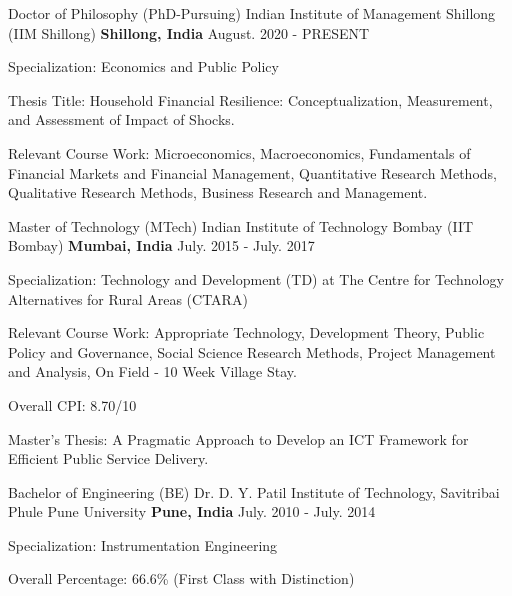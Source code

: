 
\begin{cventries}

\cventry
{Doctor of Philosophy (PhD-Pursuing)} %
{Indian Institute of Management Shillong (IIM Shillong)} %
{\textbf{Shillong, India}} %
{August. 2020 - PRESENT} %
{ %
\begin{cvitems}
\item {Specialization: Economics and Public Policy}
\item{Thesis Title: Household  Financial Resilience: Conceptualization, Measurement, and Assessment of Impact of Shocks.}
\item {Relevant Course Work: Microeconomics, Macroeconomics, Fundamentals of Financial Markets and Financial Management, Quantitative Research Methods, Qualitative Research Methods, Business Research and Management.}
\end{cvitems}
}
\end{cventries}
\cventry
{Master of Technology (MTech)} %
{Indian Institute of Technology Bombay (IIT Bombay)} %
{\textbf{Mumbai, India}} %
{July. 2015 - July. 2017} %
{ %
\begin{cvitems}
\item {Specialization: Technology and Development (TD) at The Centre for Technology Alternatives for Rural Areas (CTARA)}
\item {Relevant Course Work: Appropriate Technology, Development Theory, Public Policy and Governance, Social Science Research Methods, Project Management and Analysis, On Field - 10 Week Village Stay.}
\item {Overall CPI: 8.70/10} 
\item{Master's Thesis: A Pragmatic Approach to Develop an ICT Framework for Efficient Public Service Delivery.}
\end{cvitems}
}
\cventry
{Bachelor of Engineering (BE)} %
{Dr. D. Y. Patil Institute of Technology, Savitribai Phule Pune University} %
{\textbf{Pune, India}} %
{July. 2010 - July. 2014} %
{ %
\begin{cvitems}
\item {Specialization: Instrumentation Engineering}
\item {Overall Percentage: 66.6\% (First Class with Distinction)}
\
\end{cvitems}
}
